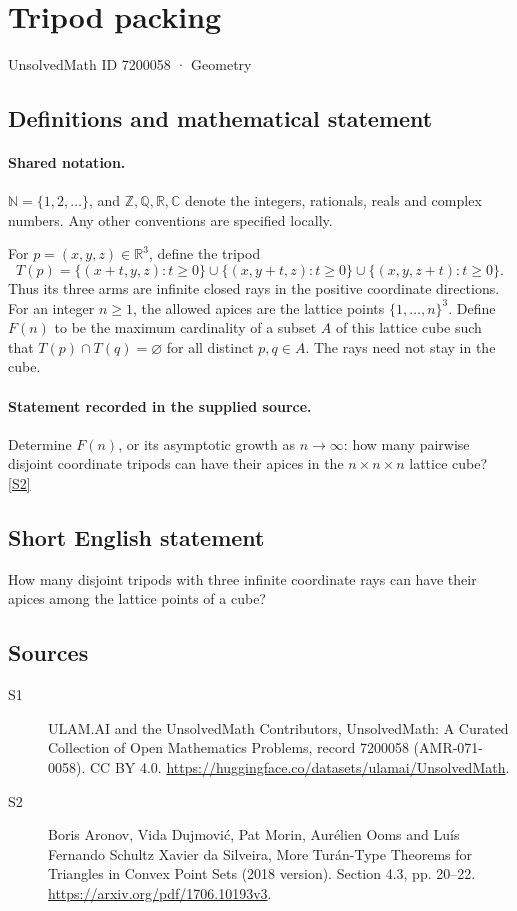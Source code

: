 \documentclass[11pt]{article}
\newcommand{\sref}[2]{\hyperlink{source:#1:#2}{[S#2]}}
\begin{document}
\setcounter{section}{7200057}
\section{Tripod packing}\label{7200058}
{\small\sffamily UnsolvedMath ID 7200058 · Geometry}
\subsection{Definitions and mathematical statement}

\paragraph{Shared notation.}$\mathbb N=\{1,2,\ldots\}$, and $\mathbb Z,\mathbb Q,\mathbb R,\mathbb C$ denote the integers, rationals, reals and complex numbers. Any other conventions are specified locally.


For $p=(x,y,z)\in\mathbb R^3$, define the tripod
\[T(p)=\{(x+t,y,z):t\geq0\}\cup\{(x,y+t,z):t\geq0\}\cup\{(x,y,z+t):t\geq0\}.\]
Thus its three arms are infinite closed rays in the positive coordinate directions. For an integer $n\geq1$, the allowed apices are the lattice points $\{1,\ldots,n\}^3$. Define $F(n)$ to be the maximum cardinality of a subset $A$ of this lattice cube such that $T(p)\cap T(q)=\varnothing$ for all distinct $p,q\in A$. The rays need not stay in the cube.
\paragraph{Statement recorded in the supplied source.}
Determine $F(n)$, or its asymptotic growth as $n\to\infty$: how many pairwise disjoint coordinate tripods can have their apices in the $n\times n\times n$ lattice cube? \sref{7200058}{2}
\subsection{Short English statement}
How many disjoint tripods with three infinite coordinate rays can have their apices among the lattice points of a cube?
\subsection{Sources}
\begin{description}
\item[\hypertarget{source:7200058:1}{S1}] ULAM.AI and the UnsolvedMath Contributors, UnsolvedMath: A Curated Collection of Open Mathematics Problems, record 7200058 (AMR-071-0058). CC BY 4.0. \url{https://huggingface.co/datasets/ulamai/UnsolvedMath}.
\item[\hypertarget{source:7200058:2}{S2}] Boris Aronov, Vida Dujmović, Pat Morin, Aurélien Ooms and Luís Fernando Schultz Xavier da Silveira, More Turán-Type Theorems for Triangles in Convex Point Sets (2018 version). Section 4.3, pp. 20–22. \url{https://arxiv.org/pdf/1706.10193v3}.
\end{description}
\label{end:7200058}
\end{document}
